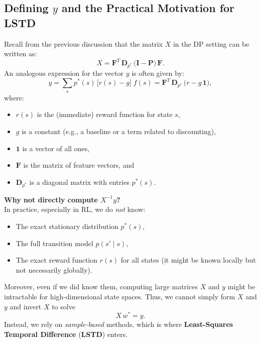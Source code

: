 \subsection{Defining \texorpdfstring{$y$}{y} and the Practical Motivation for LSTD}

Recall from the previous discussion that the matrix $X$ in the DP setting can be written as:
\[
X 
= \mathbf{F}^T\,\mathbf{D}_{p^*}\,\bigl(\mathbf{I} - \mathbf{P}\bigr)\,\mathbf{F}.
\]
An analogous expression for the vector $y$ is often given by:
\[
y
= \sum_{s} p^*(s)\,\bigl[r(s) - g\bigr]\;f(s)
= \mathbf{F}^T \,\mathbf{D}_{p^*}\,\bigl(r - g\,\mathbf{1}\bigr),
\]
where:
\begin{itemize}
    \item $r(s)$ is the (immediate) reward function for state $s$,
    \item $g$ is a constant (e.g., a baseline or a term related to discounting),
    \item $\mathbf{1}$ is a vector of all ones,
    \item $\mathbf{F}$ is the matrix of feature vectors, and
    \item $\mathbf{D}_{p^*}$ is a diagonal matrix with entries $p^*(s)$.
\end{itemize}

\noindent
\textbf{Why not directly compute \texorpdfstring{$X^{-1}y$}{X\^(-1) y}?}\\
In practice, especially in RL, we do \emph{not} know:
\begin{itemize}
    \item The exact stationary distribution $p^*(s)$,
    \item The full transition model $p(s' \mid s)$,
    \item The exact reward function $r(s)$ for all states (it might be known locally but not necessarily globally).
\end{itemize}
Moreover, even if we did know them, computing large matrices $X$ and $y$ might be intractable for high-dimensional state spaces. Thus, we cannot simply form $X$ and $y$ and invert $X$ to solve
\[
X\,w^* = y.
\]
Instead, we rely on \emph{sample-based} methods, which is where \textbf{Least-Squares Temporal Difference} (\textbf{LSTD}) enters.

